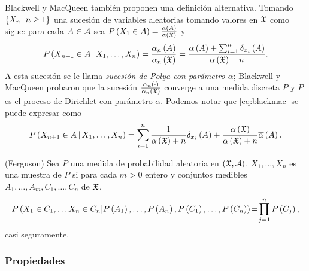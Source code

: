 Blackwell y MacQueen también proponen una definición alternativa. Tomando $\left\{ X_{n} \,|\, n \geq 1 \right\}$ una sucesión de variables %
aleatorias tomando valores en $\mathfrak{X}$ como sigue: para cada $A \in \mathcal{A}$ sea $P\Pp{X_{1} \in A} = \frac{\alpha\Pp{A}}{\alpha\Pp{%
\X}}$ y 
\begin{equation} \label{eq:blackmac}
P\Pp{X_{n+1} \in A \,|\, X_{1}, \ldots, X_{n}} = \frac{\alpha_{n}\Pp{A}}{\alpha_{n}\Pp{\X}} %
                                               = \frac{\alpha\Pp{A} + \sum_{i = 1}^{n} \delta_{x_{i}}\Pp{A}}{\alpha\Pp{\X} + n}.
\end{equation}
A esta sucesión se le llama \textit{sucesión de Polya con parámetro $\alpha$}; Blackwell y MacQueen probaron que la sucesión %
$\frac{\alpha_{n}\left( \cdot \right)}{\alpha_{n}\left( \mathfrak{X} \right)}$ converge a una medida discreta $P$ y $P$ es el proceso de Dirichlet con %
parámetro $\alpha$. Podemos notar que \eqref{eq:blackmac} se puede expresar como
\[
P\left( X_{n+1} \in A \,|\, X_{1}, \ldots, X_{n} \right) = \sum_{i = 1}^{n} \frac{1}{\alpha\left( \mathfrak{X} \right) + n} \delta_{x_{i}}\left( A \right) + 
                                                \frac{\alpha\left( \mathfrak{X} \right)}{\alpha\left( \mathfrak{X} \right) + n} \overline{\alpha}\left( A \right).
\]

\begin{defi}(Ferguson)
Sea $P$ una medida de probabilidad aleatoria en $\left( \mathfrak{X}, \mathcal{A} \right)$. $X_{1}, \ldots, X_{n}$ es una muestra de $P$ si para cada $m %
> 0$ entero y conjuntos medibles $A_{1}, \ldots, A_{m}, C_{1}, \ldots, C_{n}$ de $\mathfrak{X}$,
\[
P\Pp{X_{1} \in C_{1}, \ldots X_{n} \in C_{n} | P\Pp{A_{1}}, \ldots, P\Pp{A_{n}}, P\Pp{C_{1}}, \ldots, P\Pp{C_{n}}} %
 \!=\! \prod_{j = 1}^{n} P\Pp{C_{j}},
\]
casi seguramente.
\end{defi}

\subsubsection{Propiedades}

